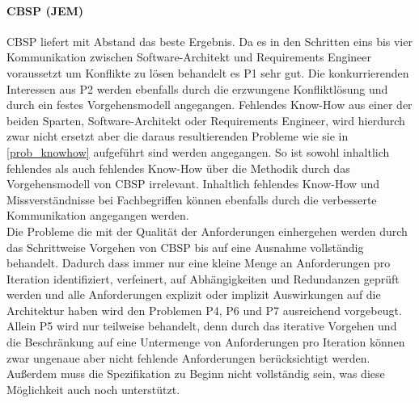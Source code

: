 \paragraph{CBSP (JEM)}
CBSP liefert mit Abstand das beste Ergebnis. Da es in den Schritten eins bis vier Kommunikation zwischen Software-Architekt und Requirements Engineer voraussetzt um Konflikte zu l\"osen behandelt es P1 sehr gut. Die konkurrierenden Interessen aus P2 werden ebenfalls durch die erzwungene Konfliktl\"osung und durch ein festes Vorgehensmodell angegangen. Fehlendes Know-How aus einer der beiden Sparten, Software-Architekt oder Requirements Engineer, wird hierdurch zwar nicht ersetzt aber die daraus resultierenden Probleme wie sie in \ref{prob_knowhow} aufgef\"uhrt sind werden angegangen. So ist sowohl inhaltlich fehlendes als auch fehlendes Know-How \"uber die Methodik durch das Vorgehensmodell von CBSP irrelevant. Inhaltlich fehlendes Know-How und Missverst\"andnisse bei Fachbegriffen k\"onnen ebenfalls durch die verbesserte Kommunikation angegangen werden. \\
Die Probleme die mit der Qualit\"at der Anforderungen einhergehen werden durch das Schrittweise Vorgehen von CBSP bis auf eine Ausnahme vollst\"andig behandelt. Dadurch dass immer nur eine kleine Menge an Anforderungen pro Iteration identifiziert, verfeinert, auf Abh\"angigkeiten und Redundanzen gepr\"uft werden und alle Anforderungen explizit oder implizit Auswirkungen auf die Architektur haben wird den Problemen P4, P6 und P7 ausreichend vorgebeugt. Allein P5 wird nur teilweise behandelt, denn durch das iterative Vorgehen und die Beschr\"ankung auf eine Untermenge von Anforderungen pro Iteration k\"onnen zwar ungenaue aber nicht fehlende Anforderungen ber\"ucksichtigt werden. Au\ss{}erdem muss die Spezifikation zu Beginn nicht vollst\"andig sein, was diese M\"oglichkeit auch noch unterst\"utzt. \\


%
